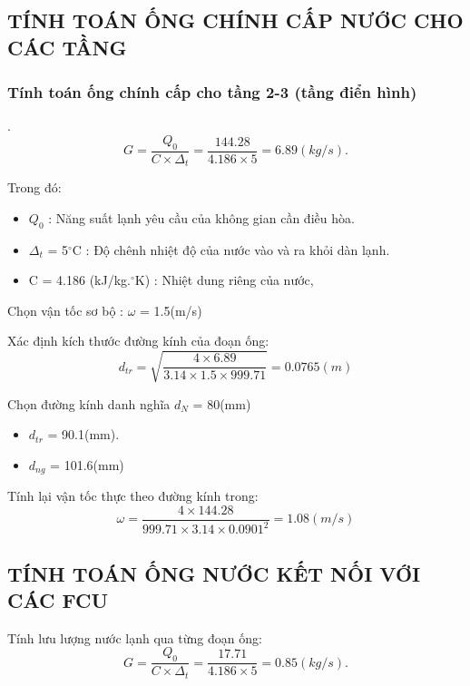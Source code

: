 \subsection{TÍNH TOÁN ỐNG CHÍNH CẤP NƯỚC CHO CÁC TẦNG}

\subsubsection{Tính toán ống chính cấp cho tầng 2-3 (tầng điển hình)}.
\begin{equation*}
	G = \dfrac{Q_{0}}{C \times \Delta_{t}} =\dfrac{144.28}{4.186 \times 5} = 6.89(kg/s).
\end{equation*}

\newpage
Trong đó:
\begin{itemize}
	\item $Q_{0}$ : Năng suất lạnh yêu cầu của không gian cần điều hòa.
	\item $\Delta_{t}$ = 5$^{\circ}$C : Độ chênh nhiệt độ của nước vào và ra khỏi dàn lạnh.
	\item C = 4.186 (kJ/kg.$^{\circ}$K) : Nhiệt dung riêng của nước,
\end{itemize}

Chọn vận tốc sơ bộ : $\omega$ = 1.5(m/s)

Xác định kích thước đường kính của đoạn ống:
\begin{equation*}
	d_{tr} = \sqrt{\dfrac{4 \times 6.89}{3.14 \times 1.5 \times 999.71}} = 0.0765(m)
\end{equation*}

Chọn đường kính danh nghĩa $d_{N}$ = 80(mm)
\begin{itemize}
	\item $d_{tr}$ = 90.1(mm).
	\item $d_{ng}$ = 101.6(mm)
\end{itemize}

Tính lại vận tốc thực theo đường kính trong:
\begin{equation*}
	\omega = \dfrac{4 \times 144.28 }{999.71 \times 3.14 \times 0.0901^{2}} = 1.08(m/s)
\end{equation*}


\subsection{TÍNH TOÁN ỐNG NƯỚC KẾT NỐI VỚI CÁC FCU }
Tính lưu lượng nước lạnh qua từng đoạn ống:
\begin{equation*}
	G = \dfrac{Q_{0}}{C \times \Delta_{t}} =\dfrac{17.71}{4.186 \times 5} = 0.85(kg/s).
\end{equation*}

